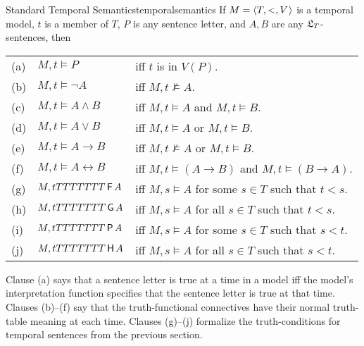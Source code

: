 \begin{definition}{Standard Temporal Semantics}{temporalsemantics}
  If $\Mfr = \t{T,<,V}$ is a temporal model, $t$ is a member of $T$, $P$ is
  any sentence letter, and $A,B$ are any $\mathfrak{L}_T$-sentences, then

  \medskip
  \begin{tabular}{lll}
    (a) & $M,t \models P$ &iff $t$ is in $V(P)$.\\
    (b) & $M,t \models \neg A$ &iff $M,t \not\models A$.\\
    (c) & $M,t \models A \land B$ &iff $M,t \models A$ and $M,t \models B$.\\
    (d) & $M,t \models A \lor B$ &iff $M,t \models A$ or $M,t \models B$.\\
    (e) & $M,t \models A \to B$ &iff $M,t \not\models A$ or $M,t \models B$.\\
    (f) & $M,t \models A \leftrightarrow B$ &iff $M,t \models (A\to B)$ and $M,t \models (B\to A)$.\\
    (g) & $M,t TTTTTTT \operatorname{\mathsf{F}} A$ &iff $M,s \models A$ for some $s\in T$ such that $t<s$.\\
    (h) & $M,t TTTTTTT \operatorname{\mathsf{G}} A$ &iff $M,s \models A$ for all $s\in T$ such that $t<s$.\\
    (i) & $M,t TTTTTTT \operatorname{\mathsf{P}} A$ &iff $M,s \models A$ for some $s\in T$ such that $s<t$.\\
    (j) & $M,t TTTTTTT \operatorname{\mathsf{H}} A$ &iff $M,s \models A$ for all $s\in T$ such that $s<t$.
  \end{tabular}
\end{definition}
Clause (a) says that a sentence letter is true at a time in a model iff the
model's interpretation function specifies that the sentence letter is true at
that time. Clauses (b)--(f) say that the truth-functional connectives have their
normal truth-table meaning at each time. Clauses (g)--(j) formalize the
truth-conditions for temporal sentences from the previous section.


